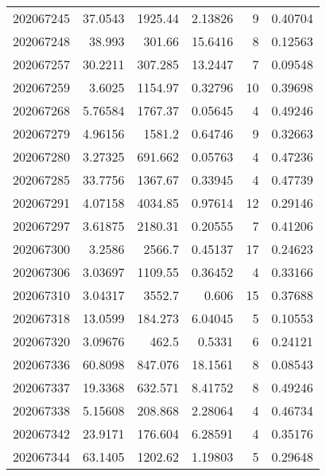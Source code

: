 \begin{tabular}{rrrrrr}
 202067245 &         37.0543  &     1925.44   &            2.13826 &           9 & 0.40704 \\
 202067248 &         38.993   &      301.66   &           15.6416  &           8 & 0.12563 \\
 202067257 &         30.2211  &      307.285  &           13.2447  &           7 & 0.09548 \\
 202067259 &          3.6025  &     1154.97   &            0.32796 &          10 & 0.39698 \\
 202067268 &          5.76584 &     1767.37   &            0.05645 &           4 & 0.49246 \\
 202067279 &          4.96156 &     1581.2    &            0.64746 &           9 & 0.32663 \\
 202067280 &          3.27325 &      691.662  &            0.05763 &           4 & 0.47236 \\
 202067285 &         33.7756  &     1367.67   &            0.33945 &           4 & 0.47739 \\
 202067291 &          4.07158 &     4034.85   &            0.97614 &          12 & 0.29146 \\
 202067297 &          3.61875 &     2180.31   &            0.20555 &           7 & 0.41206 \\
 202067300 &          3.2586  &     2566.7    &            0.45137 &          17 & 0.24623 \\
 202067306 &          3.03697 &     1109.55   &            0.36452 &           4 & 0.33166 \\
 202067310 &          3.04317 &     3552.7    &            0.606   &          15 & 0.37688 \\
 202067318 &         13.0599  &      184.273  &            6.04045 &           5 & 0.10553 \\
 202067320 &          3.09676 &      462.5    &            0.5331  &           6 & 0.24121 \\
 202067336 &         60.8098  &      847.076  &           18.1561  &           8 & 0.08543 \\
 202067337 &         19.3368  &      632.571  &            8.41752 &           8 & 0.49246 \\
 202067338 &          5.15608 &      208.868  &            2.28064 &           4 & 0.46734 \\
 202067342 &         23.9171  &      176.604  &            6.28591 &           4 & 0.35176 \\
 202067344 &         63.1405  &     1202.62   &            1.19803 &           5 & 0.29648 \\

\end{tabular}
